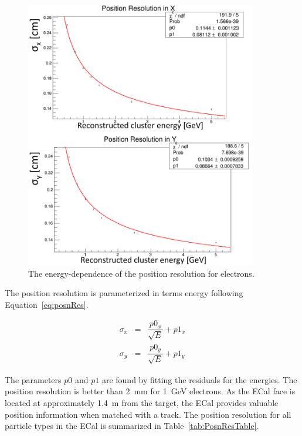 \begin{figure}[H]
  \centering
      \includegraphics[width=0.9\textwidth]{pics/performance/emPosnResn.png}
  \caption[Energy-dependent position resolution for electrons.]{The energy-dependence of the position resolution for electrons.}
  \label{Figure:emPosnResn}
\end{figure}

The position resolution is parameterized in terms energy following Equation~\eqref{eq:posnRes}.
 
\begin{eqnarray*}
\label{eq:posnRes}
\sigma_x & = & \dfrac{p0_x}{\sqrt{E}}+p1_x\\
\sigma_y & = & \dfrac{p0_y}{\sqrt{E}}+p1_y
\end{eqnarray*}

The parameters $p0$ and $p1$ are found by fitting the residuals for the energies. The position resolution is better than 2~mm for 1~GeV electrons. As the ECal face is located at  approximately 1.4~m from the target, the ECal provides valuable position information when matched with a track. The position resolution for all particle types in the ECal is summarized in Table~\ref{tab:PosnResTable}. 

